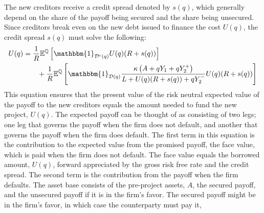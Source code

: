\documentclass[../main.tex]{subfiles}
\begin{document}
        The new creditors receive a credit spread denoted by $s(q)$,
        which generally depend on the share of the payoff being secured and the share being unsecured.
        Since creditors break even on the new debt issued to finance the cost $U(q)$,
        the credit spread $s(q)$ must solve the following:
            \begin{align}
                    U(q) 
                &=
                    \discountfactor
                    \mathbb{E}^{\rnmeasure}\left[
                        \mathbbm{1}_{\mathcal{D}^{c}(q)}
                        U(q)
                        (\grossrfrate + s(q))
                    \right]
                \nonumber \\
                &\qquad+
                    \discountfactor
                    \mathbb{E}^{\rnmeasure}\left[
                        \mathbbm{1}_{\mathcal{D}(q)}
                        \frac{
                            \kappa 
                            \left(
                                A + q Y_{1} + q Y_{2}^{+}
                            \right)
                        }{
                            L 
                            +
                            U(q)
                            (\grossrfrate + s(q))
                            +
                            q Y_{2}^{-} 
                        } 
                        U(q)
                        (\grossrfrate + s(q))    
                    \right] 
                \label{eqn:new-creditors-breakeven}
            \end{align}
        This equation ensures that the present value of the risk neutral expected value of the payoff to the new creditors
        equals the amount needed to fund the new project, $U(q)$. 
        The expected payoff can be thought of as consisting of two legs;
        one leg that governs the payoff when the firm does not default, 
        and another that governs the payoff when the firm does default. 
        The first term in this equation is the contribution to the expected value from the promised payoff,
        the face value, which is paid when the firm does not default. 
        The face value equals the borrowed amount, $U(q)$, 
        forward appreciated by the gross risk free rate and the credit spread.
        The second term is the contribution from the payoff when the firm defaults. 
        The asset base consists of the pre-project assets, $A$, 
        the secured payoff, and the unsecured payoff if it is in the firm's favor.
        The secured payoff might be in the firm's favor, in which case the counterparty must pay it, 
\end{document}
